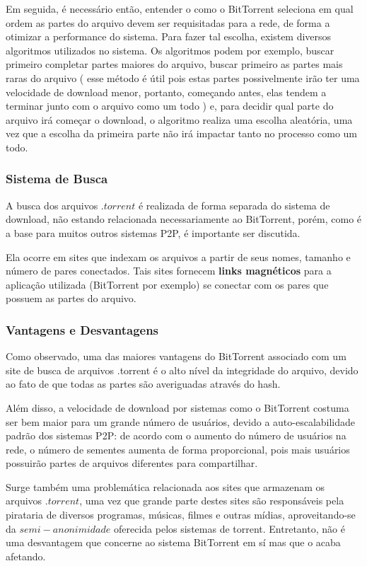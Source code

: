 \documentclass[a4paper]{article}
\begin{document}
Em seguida, é necessário então, entender o como o BitTorrent seleciona em qual ordem as partes do arquivo devem ser requisitadas para a rede, de forma a otimizar a performance do sistema. Para fazer tal escolha, existem diversos algoritmos utilizados no sistema. Os algoritmos podem por exemplo, buscar primeiro completar partes maiores do arquivo, buscar primeiro as partes mais raras do arquivo ( esse método é útil pois estas partes possivelmente irão ter uma velocidade de download menor, portanto, começando antes, elas tendem a terminar junto com o arquivo como um todo ) e, para decidir qual parte do arquivo irá começar o download, o algoritmo realiza uma escolha aleatória, uma vez que a escolha da primeira parte não irá impactar tanto no processo como um todo.\cite{CohenBIT}  

\subsubsection{Sistema de Busca}
A busca dos arquivos $.torrent$ é realizada de forma separada do sistema de download, não estando relacionada necessariamente ao BitTorrent, porém, como é a base para muitos outros sistemas P2P, é importante ser discutida.

Ela ocorre em sites que indexam os arquivos a partir de seus nomes, tamanho e número de pares conectados. Tais sites fornecem \textbf{links magnéticos} para a aplicação utilizada (BitTorrent por exemplo) se conectar com os pares que possuem as partes do arquivo. 

\subsubsection{Vantagens e Desvantagens}
Como observado, uma das maiores vantagens do BitTorrent associado com um site de busca de arquivos .torrent é o alto nível da integridade do arquivo, devido ao fato de que todas as partes são averiguadas através do hash\cite{CohenBIT}.

Além disso, a velocidade de download por sistemas como o BitTorrent costuma ser bem maior para um grande número de usuários, devido a auto-escalabilidade padrão dos sistemas P2P: de acordo com o aumento do número de usuários na rede, o número de sementes aumenta de forma proporcional, pois mais usuários possuirão partes de arquivos diferentes para compartilhar.\cite{pouwelsebit}

Surge também uma problemática relacionada aos sites que armazenam os arquivos $.torrent$, uma vez que grande parte destes sites são responsáveis pela pirataria de diversos programas, músicas, filmes e outras mídias, aproveitando-se da $semi-anonimidade$ oferecida pelos sistemas de torrent. Entretanto, não é uma desvantagem que concerne ao sistema BitTorrent em sí mas que o acaba afetando.
\end{document}
